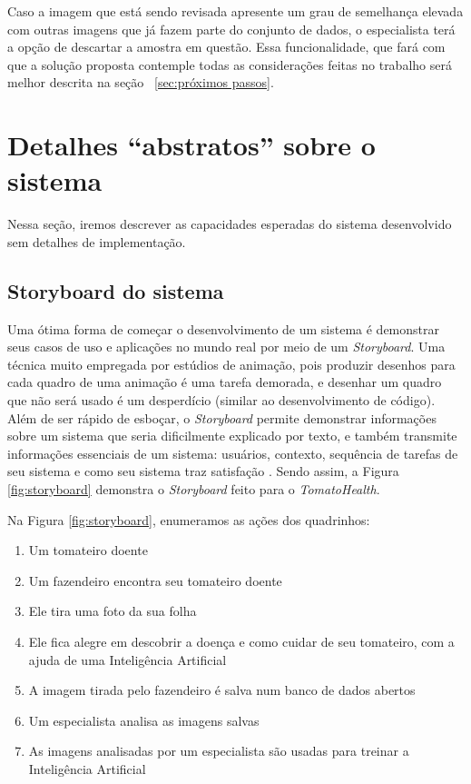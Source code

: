 Caso a imagem que está sendo revisada apresente um grau de semelhança elevada com outras imagens que já fazem parte do conjunto de dados, o especialista terá a opção de descartar a amostra em questão. Essa funcionalidade, que fará com que a solução proposta contemple todas as considerações feitas no trabalho será melhor descrita na seção ~\ref{sec:próximos passos}.

\section{{Detalhes ``abstratos'' sobre o sistema} \label{sec:abst-det}}

Nessa seção, iremos descrever as capacidades esperadas do sistema desenvolvido sem detalhes de implementação.

\subsection{{Storyboard do sistema}}

Uma ótima forma de começar o desenvolvimento de um sistema é demonstrar seus casos de uso e aplicações no mundo real por meio de um \textit{Storyboard}. Uma técnica muito empregada por estúdios de animação, pois produzir desenhos para cada quadro de uma animação é uma tarefa demorada, e desenhar um quadro que não será usado é um desperdício (similar ao desenvolvimento de código). Além de ser rápido de esboçar, o \textit{Storyboard} permite demonstrar informações sobre um sistema que seria dificilmente explicado por texto, e também transmite informações essenciais de um sistema: usuários, contexto, sequência de tarefas de seu sistema e como seu sistema traz satisfação \citep{klemmer2016}. Sendo assim, a Figura \ref{fig:storyboard} demonstra o \textit{Storyboard} feito para o \emph{TomatoHealth}.

Na Figura \ref{fig:storyboard}, enumeramos as ações dos quadrinhos:

\begin{enumerate}
    \item Um tomateiro doente
    \item Um fazendeiro encontra seu tomateiro doente
    \item Ele tira uma foto da sua folha
    \item Ele fica alegre em descobrir a doença e como cuidar de seu tomateiro, com a ajuda de uma Inteligência Artificial
    \item A imagem tirada pelo fazendeiro é salva num banco de dados abertos
    \item Um especialista analisa as imagens salvas
    \item As imagens analisadas por um especialista são usadas para treinar a Inteligência Artificial
\end{enumerate}

